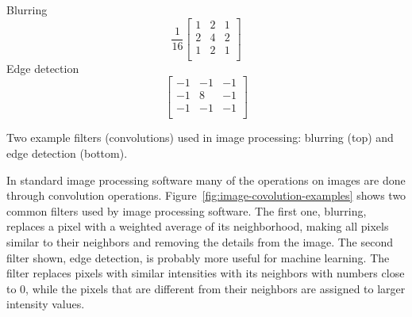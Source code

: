 \begin{marginfigure}
  \centering
  \begin{tcolorbox}
      Blurring
      \[
        \frac{1}{16} \begin{bmatrix}
          1 & 2 & 1 \\
          2 & 4 & 2 \\
          1 & 2 & 1 \\
        \end{bmatrix}
      \]
      \tcblower
     Edge detection
      \[
        \begin{bmatrix}
          -1 & -1 & -1 \\
          -1 &  8 & -1 \\
          -1 & -1 & -1 \\
        \end{bmatrix}
      \]
  \end{tcolorbox}
  \caption{Two example filters (convolutions) used in image processing:
  blurring (top) and edge detection (bottom).}
  \label{fig:image-covolution-examples}
\end{marginfigure}
In standard image processing software many of the operations on images are
done through convolution operations.
Figure~\ref{fig:image-covolution-examples} shows two common filters used
by image processing software.
The first one, blurring, replaces a pixel
with a weighted average of its neighborhood,
making all pixels similar to their neighbors
and removing the details from the image.
The second filter shown, edge detection,
is probably more useful for machine learning.
The filter replaces pixels with similar intensities with its neighbors
with numbers close to 0,
while the pixels that are different from their neighbors
are assigned to larger intensity values.

